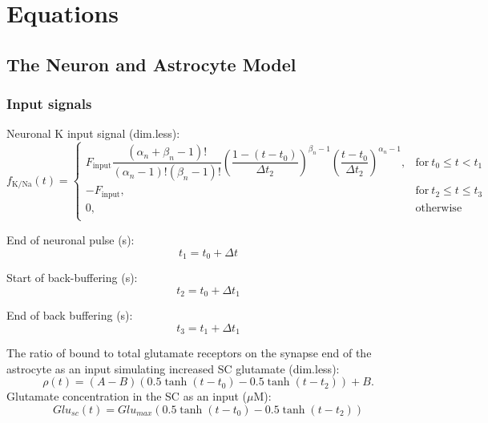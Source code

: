\section{Equations}\label{sec:equations}

\subsection{The Neuron and Astrocyte Model}

\subsubsection*{Input signals} \label{sec:InputSignal}

Neuronal \gls{K} input signal (dim.less):
\begin{equation}
f_{\text{K/Na}}(t) = 
	\begin{cases} 
		F_{\text{input}} \dfrac{(\alpha_n + \beta_n-1)!}{(\alpha_n-1)!(\beta_n-1)!} \left( \dfrac{1-(t-t_{0})}{\Delta t_2}\right) ^{\beta_n -1} \left( \dfrac{t-t_{0}}{\Delta t_2}\right) ^{\alpha_n -1}, & \text{for}\: t_{0} \leq t < t_{1} \\
		-F_{\text{input}}, & \text{for}\: t_{2} \leq t \leq t_{3} \\	
		0, & \text{otherwise}\\	
	\end{cases} 
\end{equation}

End of neuronal pulse (s):
\begin{equation}
	t_{1} = t_{0} + \Delta t
\end{equation}

Start of back-buffering (s):
\begin{equation}
	t_{2} = t_{0} + \Delta t_1
\end{equation}

End of back buffering (s):
\begin{equation}
	t_{3} = t_{1} + \Delta t_1
\end{equation}

The ratio of bound to total glutamate receptors on the synapse end of the astrocyte as an input simulating increased SC glutamate (dim.less):
\begin{equation}
\rho(t) = (A - B) \left( 0.5 \tanh (t - t_0) - 0.5 \tanh (t - t_2) \right) + B.
\end{equation}
Glutamate concentration in the SC as an input ($\mu$M):
\begin{equation}
Glu_{sc}(t) = Glu_{max} \left( 0.5 \tanh(t-t_0) - 0.5 \tanh (t - t_2) \right)
\end{equation}

